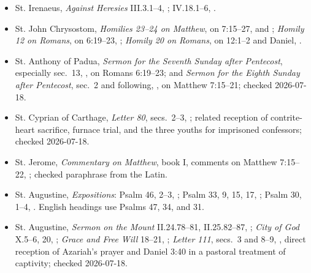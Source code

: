 {\begin{itemize}[itemsep=0em,topsep=0.15em,parsep=0pt]
\item St. Irenaeus, \emph{Against Heresies} III.3.1--4, ; IV.18.1--6, .
\item St. John Chrysostom, \emph{Homilies 23--24 on Matthew}, on 7:15--27,  and ; \emph{Homily 12 on Romans}, on 6:19--23, ; \emph{Homily 20 on Romans}, on 12:1--2 and Daniel, .
\item St. Anthony of Padua, \emph{Sermon for the Seventh Sunday after Pentecost}, especially sec.~13, , on Romans 6:19--23; and \emph{Sermon for the Eighth Sunday after Pentecost}, sec.~2 and following, , on Matthew 7:15--21; checked 2026-07-18.
\item St. Cyprian of Carthage, \emph{Letter 80}, secs.~2--3, ; related reception of contrite-heart sacrifice, furnace trial, and the three youths for imprisoned confessors; checked 2026-07-18.
\item St. Jerome, \emph{Commentary on Matthew}, book I, comments on Matthew 7:15--22, ; checked paraphrase from the Latin.
\item St. Augustine, \emph{Expositions}: Psalm 46, 2--3, ; Psalm 33, 9, 15, 17, ; Psalm 30, 1--4, . English headings use Psalms 47, 34, and 31.
\item St. Augustine, \emph{Sermon on the Mount} II.24.78--81, II.25.82--87, ; \emph{City of God} X.5--6, 20, ; \emph{Grace and Free Will} 18--21, ; \emph{Letter 111}, secs.~3 and 8--9, , direct reception of Azariah's prayer and Daniel 3:40 in a pastoral treatment of captivity; checked 2026-07-18.

\end{itemize}}
